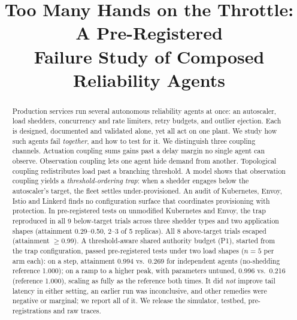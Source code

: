 \documentclass[conference]{IEEEtran}
\begin{document}
\title{Too Many Hands on the Throttle: A Pre-Registered\\Failure Study of Composed Reliability Agents}

\author{
\and
{}
}

\maketitle

\begin{abstract}
Production services run several autonomous reliability agents at once: an
autoscaler, load shedders, concurrency and rate limiters, retry budgets, and
outlier ejection. Each is designed, documented and validated alone, yet all
act on one plant. We study how such agents fail \emph{together}, and how to
test for it. We distinguish three coupling channels. Actuation coupling sums
gains past a delay margin no single agent can observe. Observation coupling
lets one agent hide demand from another. Topological coupling redistributes
load past a branching threshold. A model shows that observation coupling
yields a \emph{threshold-ordering trap}: when a shedder engages below the
autoscaler's target, the fleet settles under-provisioned. An audit of
Kubernetes, Envoy, Istio and Linkerd finds no configuration surface that
coordinates provisioning with protection. In pre-registered tests on
unmodified Kubernetes and Envoy, the trap reproduced in all 9 below-target
trials across three shedder types and two application shapes (attainment
0.29--0.50, 2--3 of 5 replicas). All 8 above-target trials escaped (attainment
$\ge$0.99). A threshold-aware shared authority budget (P1), started from
the trap configuration, passed pre-registered tests under two load shapes ($n=5$ per arm each): on
a step, attainment 0.994 vs.\ 0.269 for independent agents (no-shedding
reference 1.000); on a ramp to a higher peak, with parameters untuned, 0.996
vs.\ 0.216 (reference 1.000), scaling as fully as the reference both times.
It did \emph{not} improve tail latency in either setting, an earlier run was
inconclusive, and other remedies were negative or marginal; we report all of it. We release the simulator,
testbed, pre-registrations and raw traces.
\end{abstract}
\end{document}

